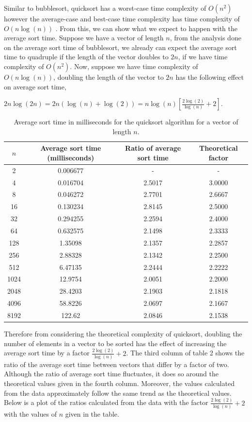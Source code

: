 \documentclass[a4paper, 12pt]{article}
\begin{document}
Similar to bubblesort, quicksort has a worst-case time complexity of $O(n^2)$ however the average-case and best-case time complexity has time complexity of $O(n\log(n))$ \cite{GueronKrasnov}. From this, we can show what we expect to happen with the average sort time. Suppose we have a vector of length $n$, from the analysis done on the average sort time of bubblesort, we already can expect the average sort time to quadruple if the length of the vector doubles to $2n$, if we have time complexity of $O(n^2)$. Now, suppose we have time complexity of $O(n\log(n))$, doubling the length of the vector to $2n$ has the following effect on average sort time,
\begin{center}
$2n\log(2n) = 2n(\log(n) + \log(2)) = n\log(n)\left[ \frac{2\log(2)}{\log(n)} + 2\right].$
\end{center} 
\begin{table}[H]
\centering
\begin{tabular}{ c | c | c | c }
$n$ & Average sort time (milliseconds) & Ratio of average sort time & Theoretical factor \\ \hline
         2     &       0.006677 & - & - \\
         4      &      0.016704 &2.5017& 3.0000\\
         8       &     0.046272 &2.7701& 2.6667\\
        16      &      0.130234 & 2.8145& 2.5000\\
        32      &      0.294255 &2.2594& 2.4000 \\
        64      &      0.632575 &2.1498 & 2.3333\\
       128     &        1.35098 & 2.1357  &2.2857\\
       256     &        2.88328 & 2.1342  &2.2500 \\
       512     &        6.47135 & 2.2444 & 2.2222\\
      1024     &        12.9754 &2.0051 & 2.2000\\
      2048     &        28.4203 & 2.1903 & 2.1818\\
      4096      &       58.8226 &2.0697 & 2.1667\\
      8192      &        122.62 &2.0846 & 2.1538\\
\end{tabular}
\caption{Average sort time in milliseconds for the quicksort algorithm for a vector of length $n$.}
\end{table}
Therefore from considering the theoretical complexity of quicksort, doubling the number of elements in a vector to be sorted has the effect of increasing the average sort time by a factor $\frac{2\log(2)}{\log(n)} + 2$. The third column of table 2 shows the ratio of the average sort time between vectors that differ by a factor of two. Although the ratio of average sort time fluctuates, it does so around the theoretical values given in the fourth column. Moreover, the values calculated from the data approximately follow the same trend as the theoretical values. Below is a plot of the ratios calculated from the data with the factor $\frac{2\log(2)}{\log(n)} + 2$ with the values of $n$ given in the table. 
\end{document}
